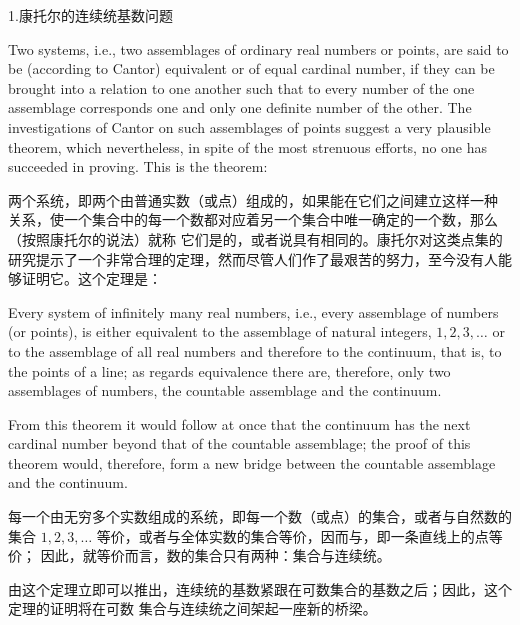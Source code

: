 \documentclass{mojing-translation}
\begin{document}
\begin{pairs}
            {1.\quad 康托尔的连续统基数问题}

\begin{original}
Two systems, i.e., two assemblages of ordinary real numbers or points, are said to be
(according to Cantor) equivalent or of equal cardinal number, if they can be brought into a
relation to one another such that to every number of the one assemblage corresponds one and
only one definite number of the other. The investigations of Cantor on such assemblages of
points suggest a very plausible theorem, which nevertheless, in spite of the most strenuous
efforts, no one has succeeded in proving. This is the theorem:
\end{original}
\begin{translated}
两个系统，即两个由普通实数（或点）组成的，如果能在它们之间建立这样一种
关系，使一个集合中的每一个数都对应着另一个集合中唯一确定的一个数，那么（按照康托尔的说法）就称
它们是的，或者说具有相同的。康托尔对这类点集的
研究提示了一个非常合理的定理，然而尽管人们作了最艰苦的努力，至今没有人能够证明它。这个定理是：
\end{translated}

\begin{original}
Every system of infinitely many real numbers, i.e., every assemblage of numbers (or points),
is either equivalent to the assemblage of natural integers, $1,2,3,\dots$ or to the assemblage
of all real numbers and therefore to the continuum, that is, to the points of a line; as
regards equivalence there are, therefore, only two assemblages of numbers, the countable
assemblage and the continuum.

From this theorem it would follow at once that the continuum has the next cardinal number
beyond that of the countable assemblage; the proof of this theorem would, therefore, form a new
bridge between the countable assemblage and the continuum.
\end{original}
\begin{translated}
每一个由无穷多个实数组成的系统，即每一个数（或点）的集合，或者与自然数的集合 $1,2,3,\dots$
等价，或者与全体实数的集合等价，因而与，即一条直线上的点等价；
因此，就等价而言，数的集合只有两种：集合与连续统。

由这个定理立即可以推出，连续统的基数紧跟在可数集合的基数之后；因此，这个定理的证明将在可数
集合与连续统之间架起一座新的桥梁。
\end{translated}


\end{pairs}
\end{document}
